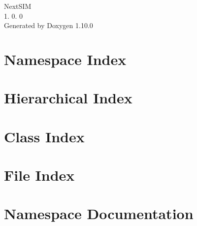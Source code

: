 \documentclass[twoside]{book}
\newcommand{\+}{\discretionary{\mbox{\scriptsize$\hookleftarrow$}}{}{}}
\newcommand{\clearemptydoublepage}{%
    \newpage{\pagestyle{empty}\cleardoublepage}%
  }
\begin{document}
  \raggedbottom
    \hypersetup{pageanchor=false,
                bookmarksnumbered=true,
                pdfencoding=unicode
               }
  \begin{titlepage}
  \vspace*{7cm}
  \begin{center}%
  {\Large Next\+SIM}\\
  [1ex]\large 1. 0. 0 \\
  \vspace*{1cm}
  {\large Generated by Doxygen 1.10.0}\\
  \end{center}
  \end{titlepage}
  \clearemptydoublepage
  \tableofcontents
  \clearemptydoublepage
  \hypersetup{pageanchor=true}


\chapter{Namespace Index}

\chapter{Hierarchical Index}

\chapter{Class Index}

\chapter{File Index}

\chapter{Namespace Documentation}














\end{document}
